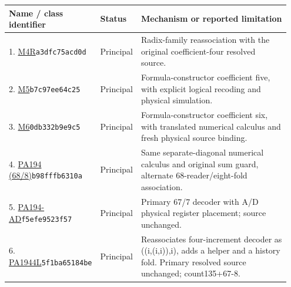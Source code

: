 \begingroup\footnotesize\setlength{\tabcolsep}{4pt}
\begin{longtable}{@{}p{0.27\linewidth}p{0.13\linewidth}p{0.55\linewidth}@{}}
\toprule Name / class identifier & Status & Mechanism or reported limitation\\\midrule\endhead
1. \href{https://github.com/VladimirReshetnikov/ProveIt/blob/32d0d8b7d93a63ad4106c18cdb29b37927acdad2/Computability/BusyBeaver/Research/PA/docs/pa194_radix_family_2026-11-13/machines/4R/machine.tm}{M4R}\newline\texttt{a3dfc75acd0d} & Principal & Radix-family reassociation with the original coefficient-four resolved source.\\[5pt]
2. \href{https://github.com/VladimirReshetnikov/ProveIt/blob/32d0d8b7d93a63ad4106c18cdb29b37927acdad2/Computability/BusyBeaver/Research/PA/docs/pa194_radix_family_2026-11-13/machines/5/machine.tm}{M5}\newline\texttt{b7c97ee64c25} & Principal & Formula-constructor coefficient five, with explicit logical recoding and physical simulation.\\[5pt]
3. \href{https://github.com/VladimirReshetnikov/ProveIt/blob/32d0d8b7d93a63ad4106c18cdb29b37927acdad2/Computability/BusyBeaver/Research/PA/docs/pa194_radix_family_2026-11-13/machines/6/machine.tm}{M6}\newline\texttt{0db332b9e9c5} & Principal & Formula-constructor coefficient six, with translated numerical calculus and fresh physical source binding.\\[5pt]
4. \href{https://github.com/VladimirReshetnikov/ProveIt/blob/32d0d8b7d93a63ad4106c18cdb29b37927acdad2/Computability/BusyBeaver/Research/PA/docs/pa194_conpa_2026-11-13_2/pa194/pa194.tm}{PA194 (68/8)}\newline\texttt{b98fffb6310a} & Principal & Same separate-diagonal numerical calculus and original sum guard, alternate 68-reader/eight-fold association.\\[5pt]
5. \href{https://github.com/VladimirReshetnikov/ProveIt/blob/32d0d8b7d93a63ad4106c18cdb29b37927acdad2/Computability/BusyBeaver/Research/PA/docs/pa194_conpa_2026-11-13/construction/tables/pa194_AD.tm}{PA194-AD}\newline\texttt{f5efe9523f57} & Principal & Primary 67/7 decoder with A/D physical register placement; source unchanged.\\[5pt]
6. \href{https://github.com/VladimirReshetnikov/ProveIt/blob/32d0d8b7d93a63ad4106c18cdb29b37927acdad2/docs/incoming/pa1944l_research_2026-11-14.zip}{PA1944L}\newline\texttt{5f1ba65184be} & Principal & Reassociates four-increment decoder as ((i,(i,i)),i), adds a helper and a history fold. Primary resolved source unchanged; count135+67-8.\\[5pt]

\end{longtable}
